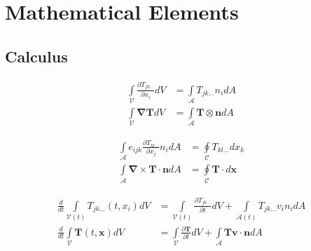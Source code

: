 \chapter{Mathematical Elements}

\section{Calculus}
\begin{teo}
\begin{align}
    \label{gauss_theorem}
    \int\limits_{\mathcal{V}}  \frac{\partial T_{jk\ldots}}{\partial x_i} dV
    &= \int\limits_{\mathcal{A}}  T_{jk\ldots} n_i dA \\
    \int\limits_{\mathcal{V}}  \boldsymbol\nabla  \boldsymbol{T} dV
    &=\int\limits_{\mathcal{A}} \boldsymbol{T} \otimes \boldsymbol{n} dA
\end{align}
\end{teo}

\begin{teo}
\begin{align}
    \label{stokes_theorem}
    \int\limits_{\mathcal{A}}  e_{ijk}\frac{\partial T_{kl\ldots}}{\partial x_j}n_i dA 
    &= \oint\limits_{\mathcal{C}}  T_{kl\ldots} dx_k \\
    \int\limits_{\mathcal{A}}  \boldsymbol\nabla \times \boldsymbol{T} \cdot \boldsymbol{n} dA
    &=\oint\limits_{\mathcal{C}} \boldsymbol{T} \cdot d\boldsymbol{x}
\end{align}
\end{teo}

\begin{teo}
\begin{align}
    \label{reynolds_theorem}
    \frac{d}{dt} \int\limits_{\mathcal{V}(t)} T_{jk\ldots}(t,x_i)  dV
    &= \int\limits_{\mathcal{V}(t)} \frac{\partial T_{jk\ldots}}{\partial t} dV + \int\limits_{\mathcal{A}(t)} T_{jk\ldots}v_i n_i  dA  \\
    \frac{d}{dt} \int\limits_{\mathcal{V}}  \boldsymbol{T}(t,\boldsymbol{x}) dV
    &= \int\limits_{\mathcal{V}} \frac{\partial \boldsymbol{T}}{\partial t} dV +\int\limits_{\mathcal{A}} \boldsymbol{T} \boldsymbol{v}\cdot \boldsymbol{n} dA
\end{align}
\end{teo}



\newpage
